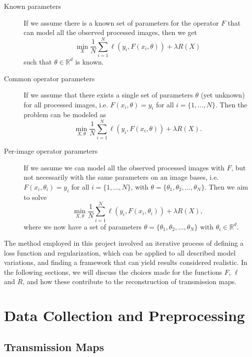 \documentclass[nomenclature, english, bibtex]{kththesis}
\numberwithin{listing}{chapter}
\begin{document}
\begin{description}
    \item[Known parameters] If we assume there is a known set of parameters for the operator $F$ that can model all the observed processed images, then we get
    \begin{equation}
        \min_{X} \frac{1}{N}\sum_{i=1}^{N} \ell(y_i, F(x_i, \theta)) + \lambda R(X)
    \end{equation}
    such that $\theta \in \mathbb{R}^d$ is known.
    \item[Common operator parameters] If we assume that there exists a single set of parameters $\theta$ (yet unknown) for all processed
    images, i.e. $F(x_i, \theta) = y_i$ for all $i = \{1,\dots,N\}$. Then the problem can be modeled as
    \begin{equation}
        \min_{X, \theta} \frac{1}{N}\sum_{i=1}^{N} \ell(y_i, F(x_i, \theta)) + \lambda R(X).
    \end{equation}
    \item[Per-image operator parameters] If we assume we can model all the observed processed images with $F$, but not necessarily with the same parameters on an image bases,
    i.e. $F(x_i, \theta_i) = y_i$ for all $i = \{1,\dots,N\}$, with  $\theta = \{ \theta_1, \theta_2, \dots, \theta_N \}$. Then we aim to solve
    \begin{equation}
        \min_{X, \theta} \frac{1}{N}\sum_{i=1}^{N} \ell(y_i, F(x_i, \theta_i)) + \lambda R(X),
    \end{equation}
    where we now have a set of parameters $\theta = \{\theta_1, \theta_2, \dots, \theta_N\} \text{ with }\theta_i \in \mathbb{R}^{d}$.
\end{description}


The method employed in this project involved an iterative process of defining a loss function and regularization,
which can be applied to all described model variations, and finding a framework that can yield results considered realistic.
In the following sections, we will discuss the choices made for the functions $F$, $\ell$ and $R$, and how these contribute
to the reconstruction of transmission maps.

\section{Data Collection and Preprocessing}
\label{sec:dataCollection}


\subsection{Transmission Maps}
\end{document}
